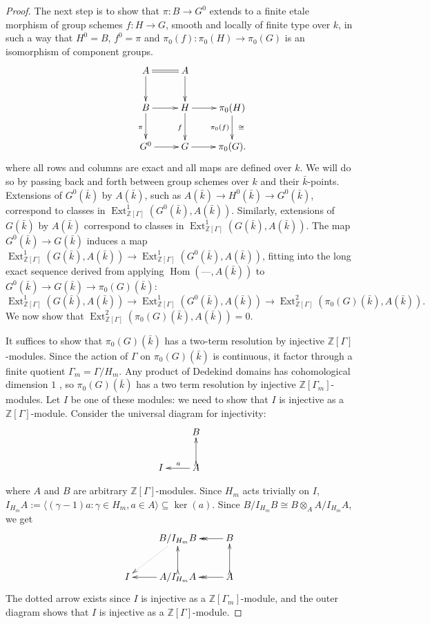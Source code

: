 \documentclass[11pt]{amsart}
\theoremstyle{plain}
\theoremstyle{definition}
\theoremstyle{remark}
\newcommand{\ZZ}{{\mathbb{Z}}}
\newcommand{\bFq}{\bar{k}}
\newcommand{\Fq}{k}
\DeclareMathOperator{\Hom}{Hom}
\DeclareMathOperator{\Ext}{Ext}
\newcommand{\iso}{{\ \cong\ }}
\begin{document}
\begin{proof}
  The next step is to show that $\pi: B \to G^0$ extends to a finite
  etale morphism of group schemes $f: H\to G$, smooth and locally of
  finite type over $\Fq$, in such a way that $H^0 = B$, $f^0 =\pi$ and
  $\pi_0(f) : \pi_0(H)\to \pi_0(G)$ is an isomorphism of component
  groups.
  \begin{equation} \label{extension-diagram}
    \xymatrix{
      & A \ar[d] \ar@{=}[r] & A \ar[d] &  \\
      & B \ar[r] \ar[d]_{\pi} & H \ar[r] \ar[d]_{f} & \pi_0(H) \ar[d]_{\pi_0(f)}^{\iso} \\
      & G^0 \ar[r] & G \ar[r] & \pi_0(G).
    }
  \end{equation}
  where all rows and columns are exact and all maps are defined over
  $\Fq$.  We will do so by passing back and forth between group
  schemes over $\Fq$ and their $\bFq$-points.  Extensions of
  $G^0(\bFq)$ by $A(\bFq)$, such as $A(\bFq) \to H^0(\bFq) \to G^0(\bFq)$,
  correspond to classes in $\Ext^1_{\ZZ[\Gamma]}(G^0(\bFq), A(\bFq))$.
  Similarly, extensions of $G(\bFq)$ by $A(\bFq)$ correspond to
  classes in $\Ext^1_{\ZZ[\Gamma]}(G(\bFq), A(\bFq))$.  The map
  $G^0(\bFq) \to G(\bFq)$ induces a map
  $\Ext^1_{\ZZ[\Gamma]}(G(\bFq), A(\bFq)) \to \Ext^1_{\ZZ[\Gamma]}(G^0(\bFq), A(\bFq))$,
  fitting into the long exact sequence derived from applying
  $\Hom(\mbox{---}, A(\bFq))$ to $G^0(\bFq) \to G(\bFq) \to \pi_0(G)(\bFq)$:
  $$\Ext^1_{\ZZ[\Gamma]}(G(\bFq), A(\bFq)) \to \Ext^1_{\ZZ[\Gamma]}(G^0(\bFq), A(\bFq)) \to \Ext^2_{\ZZ[\Gamma]}(\pi_0(G)(\bFq), A(\bFq)).$$
  We now show that $\Ext^2_{\ZZ[\Gamma]}(\pi_0(G)(\bFq), A(\bFq)) = 0$.

  It suffices to show that $\pi_0(G)(\bFq)$ has a two-term resolution
  by injective $\ZZ[\Gamma]$-modules.  Since the action of $\Gamma$ on
  $\pi_0(G)(\bFq)$ is continuous, it factor through a finite quotient
  $\Gamma_m = \Gamma / H_m$.  Any product of Dedekind domains has
  cohomological dimension $1$ \cite[?]{?}, so $\pi_0(G)(\bFq)$ has a
  two term resolution by injective $\ZZ[\Gamma_m]$-modules.  Let $I$
  be one of these modules: we need to show that $I$ is injective as a
  $\ZZ[\Gamma]$-module.  Consider the universal diagram for injectivity:
  \[
  \xymatrix{
    & B \\
    I & A \ar@{>->}[u] \ar[l]_{a}
    }
  \]

  where $A$ and $B$ are arbitrary $\ZZ[\Gamma]$-modules.  Since $H_m$ acts trivially on $I$,
  $I_{H_m}A := \langle (\gamma-1)a : \gamma \in H_m, a \in A \rangle \subseteq \ker(a).$
  Since $B / I_{H_m}B \cong B \otimes_A A / I_{H_m}A$, we get
  \[
  \xymatrix{
    & B/I_{H_m}B \ar@{..>}[dl] & B \ar@{->>}[l] \\
    I & A/I_{H_m}A \ar@{>->}[u] \ar[l] & A \ar@{>->}[u] \ar@{->>}[l]
    }
  \]
  The dotted arrow exists since $I$ is injective as a
  $\ZZ[\Gamma_m]$-module, and the outer diagram shows that $I$ is
  injective as a $\ZZ[\Gamma]$-module.


\end{proof}
\end{document}
